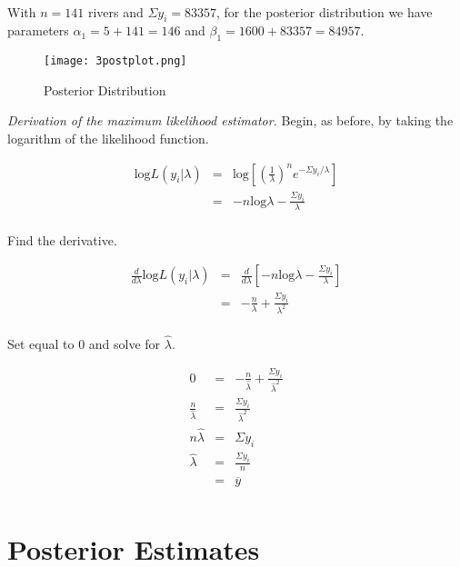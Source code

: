 \documentclass[12pt]{article}
\newcommand{\ybar}{\overline{y}}
\begin{document}
\ \\ [-1.55cm]

\noindent With $n=141$ rivers and $\Sigma y_i=83357$, for the posterior distribution we have parameters $\alpha_1=5+141=146$ and $\beta_1=1600+83357=84957$. \\ [-.85cm]

\begin{figure}[H]
\begin{center}
\texttt{[image: 3postplot.png]}
\caption{Posterior Distribution}
\end{center}
\end{figure}

\noindent \textit{Derivation of the maximum likelihood estimator.}  Begin, as before, by taking the logarithm of the likelihood function.

\begin{eqnarray*}
\mathrm{log}L(y_i|\lambda) &=& \mathrm{log}\left[\left(\frac{1}{\lambda}\right)^ne^{-\Sigma y_i/\lambda}\right] \\
&=& -n\mathrm{log}\lambda-\frac{\Sigma y_i}{\lambda} \\
\end{eqnarray*}

\noindent Find the derivative.

\begin{eqnarray*}
\frac{d}{d\lambda}\mathrm{log}L(y_i|\lambda) &=& \frac{d}{d\lambda}\left[-n\mathrm{log}\lambda-\frac{\Sigma y_i}{\lambda}\right] \\
&=& -\frac{n}{\lambda}+\frac{\Sigma y_i}{\lambda^2} \\
\end{eqnarray*}

\noindent Set equal to 0 and solve for $\hat{\lambda}$.

\begin{eqnarray*}
0 &=& -\frac{n}{\hat{\lambda}}+\frac{\Sigma y_i}{\hat{\lambda}^2} \\
\frac{n}{\hat{\lambda}} &=& \frac{\Sigma y_i}{\hat{\lambda}^2} \\
n\hat{\lambda} &=& \Sigma y_i \\
\hat{\lambda} &=& \frac{\Sigma y_i}{n} \\
&=& \ybar \\
\end{eqnarray*}

\section*{Posterior Estimates}
\end{document}
